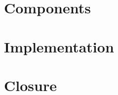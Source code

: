 \chapter{Components} \label{c:Components}				%

\chapter{Implementation}\label{c:Implementation}	%





\chapter{Closure} \label{c:Closure}			


\appendix
\printindex					%
\listoffigures				%
\printbibliography[			%
	heading=bibintoc,
	title={Bibliography}]
	
